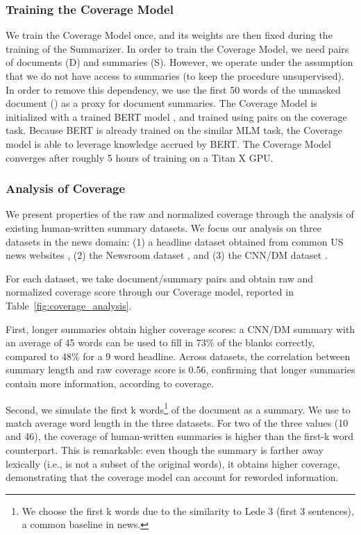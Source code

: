\documentclass[11pt,a4paper]{article}
\begin{document}
\subsubsection{Training the Coverage Model}
\label{section:coverage_pretraining}
We train the Coverage Model once, and its weights are then fixed during the training of the Summarizer.
In order to train the Coverage Model, we need pairs of documents (D) and summaries (S). However, we operate under the assumption that we do not have access to summaries (to keep the procedure unsupervised). In order to remove this dependency, we use the first 50 words  of the unmasked document () as a proxy for document summaries.
The Coverage Model is initialized with a trained BERT model \cite{devlin2019bert}, and trained using  pairs on the coverage task. Because BERT is already trained on the similar MLM task, the Coverage model is able to leverage knowledge accrued by BERT. The Coverage Model converges after roughly 5 hours of training on a Titan X GPU.

\subsubsection{Analysis of Coverage}
We present properties of the raw and normalized coverage through the analysis of existing human-written summary datasets. We focus our analysis on three datasets in the news domain: (1) a headline dataset obtained from common US news websites \cite{laban2017newslens}, (2) the Newsroom dataset  \cite{grusky2018newsroom}, and (3) the CNN/DM dataset \cite{nallapati2016abstractive}.

For each dataset, we take document/summary pairs and obtain raw and normalized coverage score through our Coverage model, reported in Table~\ref{fig:coverage_analysis}.

First, longer summaries obtain higher coverage scores: a CNN/DM summary with an average of 45 words can be used to fill in 73\% of the blanks correctly, compared to 48\% for a 9 word headline. Across datasets, the correlation between summary length and raw coverage score is 0.56, confirming that longer summaries contain more information, according to coverage.

Second, we simulate the first k words\footnote{We choose the first k words due to the similarity to Lede 3 (first 3 sentences), a common baseline in news.} of the document as a summary. We use  to match average word length in the three datasets. For two of the three values (10 and 46), the coverage of human-written summaries is higher than the first-k word counterpart. This is remarkable: even though the summary is farther away lexically (i.e., is not a subset of the original words), it obtains higher coverage, demonstrating that the coverage model can account for reworded information.
\end{document}
